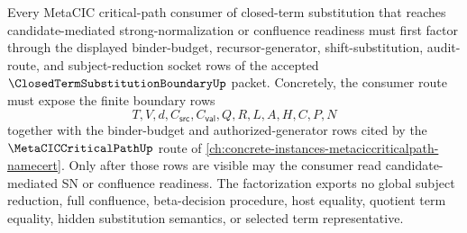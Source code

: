 \begin{theorem}
\label{thm:closed-term-substitution-boundary-metacic-socket-factorization}
Every MetaCIC critical-path consumer of closed-term substitution that reaches candidate-mediated strong-normalization or confluence readiness must first factor through the displayed binder-budget, recursor-generator, shift-substitution, audit-route, and subject-reduction socket rows of the accepted $\ClosedTermSubstitutionBoundaryUp$ packet. Concretely, the consumer route must expose the finite boundary rows
$$
T,V,d,C_{\mathsf{src}},C_{\mathsf{val}},Q,R,L,A,H,C,P,N
$$
together with the binder-budget and authorized-generator rows cited by the $\MetaCICCriticalPathUp$ route of \autoref{ch:concrete-instances-metaciccriticalpath-namecert}. Only after those rows are visible may the consumer read candidate-mediated SN or confluence readiness. The factorization exports no global subject reduction, full confluence, beta-decision procedure, host equality, quotient term equality, hidden substitution semantics, or selected term representative.
\end{theorem}
